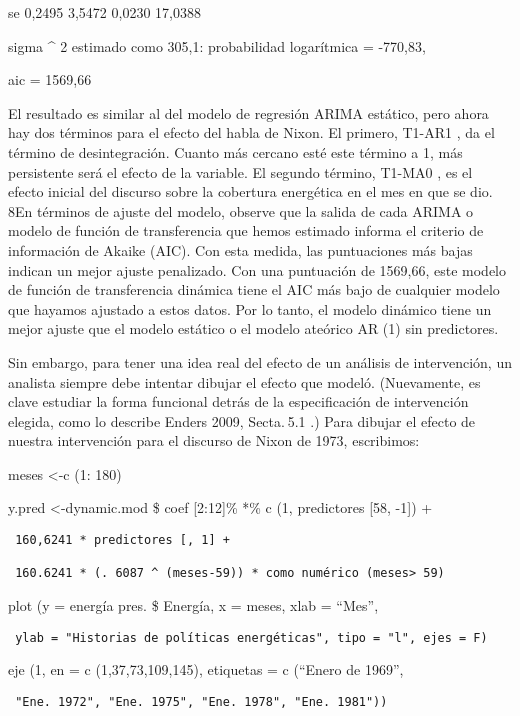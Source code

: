 \documentclass[
]{book}
\begin{document}
se 0,2495 3,5472 0,0230 17,0388

sigma \^{} 2 estimado como 305,1: probabilidad logarítmica = -770,83,

aic = 1569,66

El resultado es similar al del modelo de regresión ARIMA estático, pero ahora hay dos términos para el efecto del habla de Nixon. El primero, T1-AR1 , da el término de desintegración. Cuanto más cercano esté este término a 1, más persistente será el efecto de la variable. El segundo término, T1-MA0 , es el efecto inicial del discurso sobre la cobertura energética en el mes en que se dio. 8En términos de ajuste del modelo, observe que la salida de cada ARIMA o modelo de función de transferencia que hemos estimado informa el criterio de información de Akaike (AIC). Con esta medida, las puntuaciones más bajas indican un mejor ajuste penalizado. Con una puntuación de 1569,66, este modelo de función de transferencia dinámica tiene el AIC más bajo de cualquier modelo que hayamos ajustado a estos datos. Por lo tanto, el modelo dinámico tiene un mejor ajuste que el modelo estático o el modelo ateórico AR (1) sin predictores.

Sin embargo, para tener una idea real del efecto de un análisis de intervención, un analista siempre debe intentar dibujar el efecto que modeló. (Nuevamente, es clave estudiar la forma funcional detrás de la especificación de intervención elegida, como lo describe Enders 2009, Secta. 5.1 .) Para dibujar el efecto de nuestra intervención para el discurso de Nixon de 1973, escribimos:

meses \textless-c (1: 180)

y.pred \textless-dynamic.mod \$ coef {[}2:12{]}\% *\% c (1, predictores {[}58, -1{]}) +

\begin{verbatim}
 160,6241 * predictores [, 1] +

 160.6241 * (. 6087 ^ (meses-59)) * como numérico (meses> 59)
\end{verbatim}

plot (y = energía pres. \$ Energía, x = meses, xlab = ``Mes'',

\begin{verbatim}
 ylab = "Historias de políticas energéticas", tipo = "l", ejes = F)
\end{verbatim}

eje (1, en = c (1,37,73,109,145), etiquetas = c (``Enero de 1969'',

\begin{verbatim}
 "Ene. 1972", "Ene. 1975", "Ene. 1978", "Ene. 1981"))
\end{verbatim}
\end{document}
